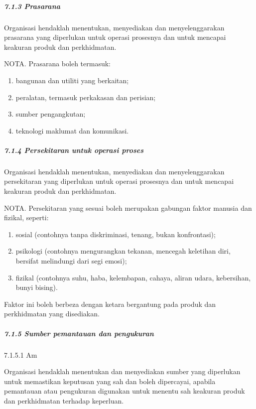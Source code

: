\documentclass[
]{article}
\begin{document}
\hypertarget{prasarana}{%
\subparagraph{7.1.3 Prasarana}\label{prasarana}}

Organisasi hendaklah menentukan, menyediakan dan menyelenggarakan
prasarana yang diperlukan untuk operasi prosesnya dan untuk mencapai
keakuran produk dan perkhidmatan.

NOTA. Prasarana boleh termasuk:

\begin{enumerate}
\def\labelenumi{\alph{enumi})}
\item
  bangunan dan utiliti yang berkaitan;
\item
  peralatan, termasuk perkakasan dan perisian;
\item
  sumber pengangkutan;
\item
  teknologi maklumat dan komunikasi.
\end{enumerate}

\hypertarget{persekitaran-untuk-operasi-proses}{%
\subparagraph{7.1.4 Persekitaran untuk operasi
proses}\label{persekitaran-untuk-operasi-proses}}

Organisasi hendaklah menentukan, menyediakan dan menyelenggarakan
persekitaran yang diperlukan untuk operasi prosesnya dan untuk mencapai
keakuran produk dan perkhidmatan.

NOTA. Persekitaran yang sesuai boleh merupakan gabungan faktor manusia
dan fizikal, seperti:

\begin{enumerate}
\def\labelenumi{\alph{enumi})}
\item
  sosial (contohnya tanpa diskriminasi, tenang, bukan konfrontasi);
\item
  psikologi (contohnya mengurangkan tekanan, mencegah keletihan diri,
  bersifat melindungi dari segi emosi);
\item
  fizikal (contohnya suhu, haba, kelembapan, cahaya, aliran udara,
  kebersihan, bunyi bising).
\end{enumerate}

Faktor ini boleh berbeza dengan ketara bergantung pada produk dan
perkhidmatan yang disediakan.

\hypertarget{sumber-pemantauan-dan-pengukuran}{%
\subparagraph{7.1.5 Sumber pemantauan dan
pengukuran}\label{sumber-pemantauan-dan-pengukuran}}

7.1.5.1 Am

Organisasi hendaklah menentukan dan menyediakan sumber yang diperlukan
untuk memastikan keputusan yang sah dan boleh dipercayai, apabila
pemantauan atau pengukuran digunakan untuk menentu sah keakuran produk
dan perkhidmatan terhadap keperluan.
\end{document}
